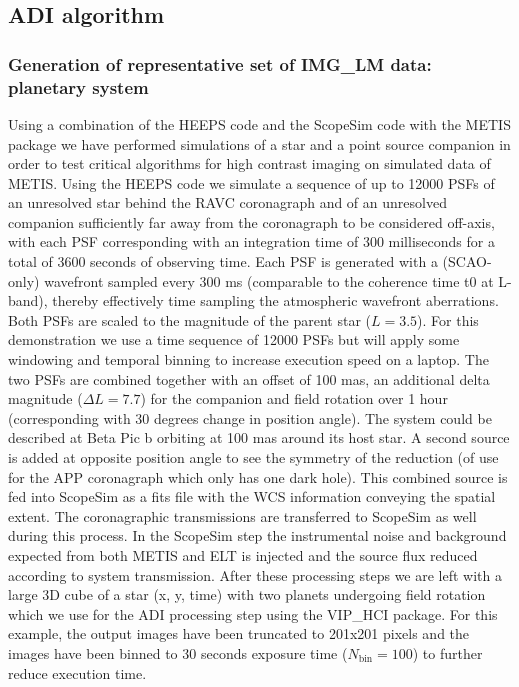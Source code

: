 \subsection{ADI algorithm}\label{ssec:criticaladialgorithm}
\subsubsection{Generation of representative set of IMG\_LM data: planetary system}
Using a combination of the HEEPS code and the ScopeSim code with the METIS package we have performed simulations of a star and a point source companion in order to test critical algorithms for high contrast imaging on simulated data of METIS.
Using the HEEPS code we simulate a sequence of up to 12000 PSFs of an unresolved star behind the RAVC coronagraph and of an unresolved companion sufficiently far away from the coronagraph to be considered off-axis, with each PSF corresponding with an integration time of 300 milliseconds for a total of 3600 seconds of observing time. Each PSF is generated with a (SCAO-only) wavefront sampled every 300 ms (comparable to the coherence time t0 at L-band), thereby effectively time sampling the atmospheric wavefront aberrations. Both PSFs are scaled to the magnitude of the parent star ($L=3.5$). For this demonstration we use a time sequence of 12000 PSFs but will apply some windowing and temporal binning to increase execution speed on a laptop. 
The two PSFs are combined together with an offset of 100 mas, an additional delta magnitude ($\Delta L=7.7$) for the companion and field rotation over 1 hour (corresponding with 30 degrees change in position angle). The system could be described at Beta Pic b orbiting at 100 mas around its host star. A second source is added at opposite position angle to see the symmetry of the reduction (of use for the APP coronagraph which only has one dark hole). This combined source is fed into ScopeSim as a fits file with the WCS information conveying the spatial extent. The coronagraphic transmissions are transferred to ScopeSim as well during this process.
In the ScopeSim step the instrumental noise and background expected from both METIS and ELT is injected and the source flux reduced according to system transmission. 
After these processing steps we are left with a large 3D cube of a star (x, y, time) with two planets undergoing field rotation which we use for the ADI processing step using the VIP\_HCI package. For this example, the output images have been truncated to 201x201 pixels and the images have been binned to 30 seconds exposure time ($N_\mathrm{bin}=100$) to further reduce execution time.
